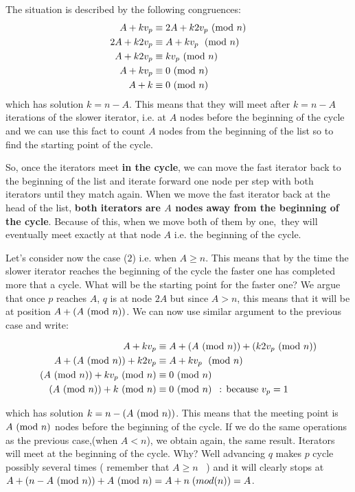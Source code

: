 The situation is described by the following congruences:
\begin{align}
  A + kv_p &\equiv 2A + k2v_p \ (\mathrm{mod}\ n) \\
  2A + k2v_p &\equiv A + kv_p \;  \ (\mathrm{mod}\ n) \\
  A + k2v_p &\equiv kv_p   \ (\mathrm{mod}\ n) \\
  A +kv_p &\equiv 0   \ (\mathrm{mod}\ n) \\
  A +k &\equiv 0  \ (\mathrm{mod}\ n)
\end{align}
which has solution \(k = n-A\). This means that they will meet after \(k=n-A\) iterations of the slower iterator, i.e. at \(A\) nodes before the beginning of the cycle and we can use this fact to count \(A\) nodes from the beginning of the list so to find the starting point of the cycle. 

So, once the iterators meet \textbf{in the cycle}, we can move the fast iterator back to the beginning of the list and iterate forward one node per step with both iterators until they match again. When we move the fast iterator back at the head of the list, \textbf{both iterators are \(A\) nodes away from the beginning of the cycle}. Because of this, when we move both of them by one, they will eventually meet exactly at that node \(A\) i.e. the beginning of the cycle.


Let's consider now the case ($2$) i.e.  when \(A \geq n\). This means that by the time the slower iterator reaches the beginning of the cycle the faster one has completed more that a cycle. What will be the starting point for the faster one? We argue that once \(p\) reaches \(A\), \(q\) is at node \(2A\) but since \(A > n\), this means that it will be at position \(A + (A \ (\mathrm{mod}\ n))\). We can now use similar argument to the previous case and write:

\begin{align}
  A + kv_p &\equiv A + (A \ (\mathrm{mod}\ n)) + (k2v_p \ (\mathrm{mod}\ n)) \\
  A + (A \ (\mathrm{mod}\ n)) + k2v_p &\equiv A + kv_p\;\ (\mathrm{mod}\ n) \\
  (A \ (\mathrm{mod}\ n)) + kv_p \ (\mathrm{mod}\ n) & \equiv 0\ (\mathrm{mod}\ n) \\
  (A \ (\mathrm{mod}\ n)) + k \ (\mathrm{mod}\ n) &\equiv 0 \ (\mathrm{mod}\ n) \: \: \text{  : because  } v_p=1 \\
\end{align}


which has solution \(k = n-(A \ (\mathrm{mod}\ n))\). This means that the meeting point is \(A \ (\mathrm{mod}\ n)\) nodes before the beginning of the cycle. If we do the same operations as the previous case,(when \(A < n\)), we obtain again, the same result. Iterators will meet at the beginning of the cycle. Why? Well advancing \(q\) makes \(p\) cycle possibly several times ( remember that \(A \geq n\)  ) and it will clearly stops at \( A+(n-A \ (\mathrm{mod}\ n)) + A \ (\mathrm{mod}\ n) = A +n \;(mod (n))= A\).

